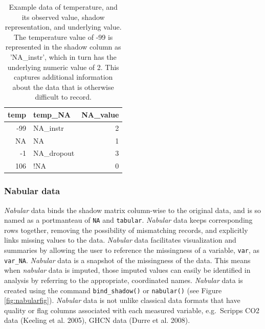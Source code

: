 \documentclass[]{article}
\theoremstyle{definition}
\theoremstyle{definition}
\theoremstyle{definition}
\theoremstyle{remark}
\begin{document}
\begin{table}[!h]

\caption{\label{tab:shadow-encoding}Example data of temperature, and its observed value, shadow representation, and underlying value. The temperature value of -99 is represented in the shadow column as 'NA\_instr', which in turn has the underlying numeric value of 2. This captures additional information about the data that is otherwise difficult to record.}
\centering
\begin{tabular}[t]{rlr}
\toprule
temp & temp\_NA & NA\_value\\
\midrule
-99 & NA\_instr & 2\\
NA & NA & 1\\
-1 & NA\_dropout & 3\\
106 & !NA & 0\\
\bottomrule
\end{tabular}
\end{table}

\hypertarget{nabular-data}{%
\subsubsection{Nabular data}\label{nabular-data}}

\emph{Nabular} data binds the shadow matrix column-wise to the original
data, and is so named as a portmanteau of \texttt{NA} and
\texttt{tabular}. \emph{Nabular} data keeps corresponding rows together,
removing the possibility of mismatching records, and explicitly links
missing values to the data. \emph{Nabular} data facilitates
visualization and summaries by allowing the user to reference the
missingness of a variable, \texttt{var}, as \texttt{var\_NA}.
\emph{Nabular} data is a snapshot of the missingness of the data. This
means when \emph{nabular} data is imputed, those imputed values can
easily be identified in analysis by referring to the appropriate,
coordinated names. \emph{Nabular} data is created using the command
\texttt{bind\_shadow()} or \texttt{nabular()} (see Figure
\ref{fig:nabularfig}). \emph{Nabular} data is not unlike classical data
formats that have quality or flag columns associated with each measured
variable, e.g.~Scripps CO2 data (Keeling et al. 2005), GHCN data (Durre
et al. 2008).
\end{document}
